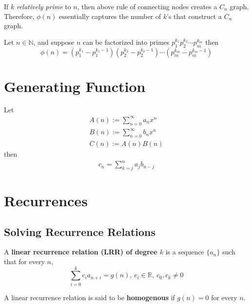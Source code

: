 \documentclass{article}
\def\R{{\mathbb R}}
\begin{document}
				\begin{theorem}
					If $k$ \emph{relatively prime} to $n$, then above rule of connecting nodes creates a $C_n$ graph. Therefore, $\phi(n)$ essentially captures the number of $k$'s that construct a $C_n$ graph.
				\end{theorem}
				
			\begin{theorem}
				Let $n \in \mathbb{N}$, and suppose $n$ can be factorized into primes $p_1^{k_1} p_2^{k_2} \cdots p_m^{k_m}$ then
				\[
					\phi(n) = (p_1^{k_1} - p_1^{k_1 - 1})(p_2^{k_2} - p_2^{k_2 - 1}) \cdots (p_m^{k_m} - p_m^{k_m - 1})
				\]
			\end{theorem}
			
		\section{Generating Function}
			\begin{theorem}
				Let 
				\begin{gather}
					A(n) := \sum_{n=0}^\infty a_n x^n \\
					B(n) := \sum_{n=0}^\infty b_n x^n \\
					C(n) := A(n) B(n)
				\end{gather}
				then
				\begin{gather}
					c_n = \sum_{k=j}^n a_j b_{n-j}
				\end{gather}
			\end{theorem}

		\section{Recurrences}
			\subsection{Solving Recurrence Relations}
				\begin{definition}
					A \textbf{linear recurrence relation (LRR) of degree $k$} is a sequence $\{a_n\}$ such that for every $n$, 
					\begin{equation}
						\sum_{i=0}^k c_i a_{n+i} = g(n),\ c_i \in \R,\ c_0, c_k \neq 0
					\end{equation}
				\end{definition}
				
				\begin{definition}
					A linear recurrence relation is said to be \textbf{homogenous} if $g(n) = 0$ for every $n$.
				\end{definition}
				
\end{document}
